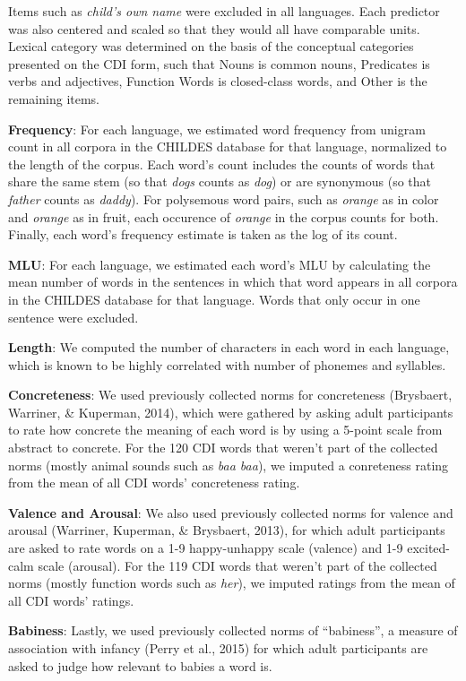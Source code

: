 \documentclass[10pt, letterpaper]{article}
\begin{document}
Items such as \emph{child's own name} were excluded in all languages.
Each predictor was also centered and scaled so that they would all have
comparable units. Lexical category was determined on the basis of the
conceptual categories presented on the CDI form, such that Nouns is
common nouns, Predicates is verbs and adjectives, Function Words is
closed-class words, and Other is the remaining items.

\textbf{Frequency}: For each language, we estimated word frequency from
unigram count in all corpora in the CHILDES database for that language,
normalized to the length of the corpus. Each word's count includes the
counts of words that share the same stem (so that \emph{dogs} counts as
\emph{dog}) or are synonymous (so that \emph{father} counts as
\emph{daddy}). For polysemous word pairs, such as \emph{orange} as in
color and \emph{orange} as in fruit, each occurence of \emph{orange} in
the corpus counts for both. Finally, each word's frequency estimate is
taken as the log of its count.

\textbf{MLU}: For each language, we estimated each word's MLU by
calculating the mean number of words in the sentences in which that word
appears in all corpora in the CHILDES database for that language. Words
that only occur in one sentence were excluded.

\textbf{Length}: We computed the number of characters in each word in
each language, which is known to be highly correlated with number of
phonemes and syllables.

\textbf{Concreteness}: We used previously collected norms for
concreteness (Brysbaert, Warriner, \& Kuperman, 2014), which were
gathered by asking adult participants to rate how concrete the meaning
of each word is by using a 5-point scale from abstract to concrete. For
the 120 CDI words that weren't part of the collected norms (mostly
animal sounds such as \emph{baa baa}), we imputed a conreteness rating
from the mean of all CDI words' concreteness rating.

\textbf{Valence and Arousal}: We also used previously collected norms
for valence and arousal (Warriner, Kuperman, \& Brysbaert, 2013), for
which adult participants are asked to rate words on a 1-9 happy-unhappy
scale (valence) and 1-9 excited-calm scale (arousal). For the 119 CDI
words that weren't part of the collected norms (mostly function words
such as \emph{her}), we imputed ratings from the mean of all CDI words'
ratings.

\textbf{Babiness}: Lastly, we used previously collected norms of
``babiness'', a measure of association with infancy (Perry et al., 2015)
for which adult participants are asked to judge how relevant to babies a
word is.
\end{document}
